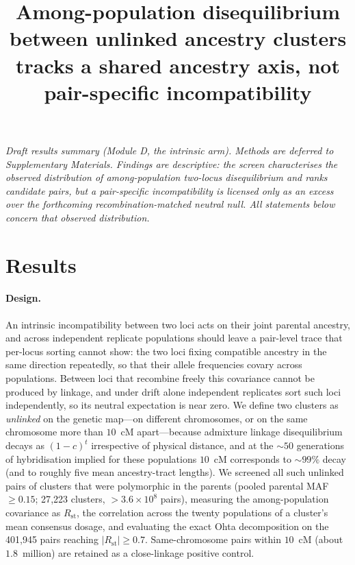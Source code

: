 \documentclass[11pt]{article}
\title{\vspace{-3em}Among-population disequilibrium between unlinked ancestry
clusters tracks a shared ancestry axis, not pair-specific incompatibility}
\author{}
\date{}
\newcommand{\Rst}{\ensuremath{R_{\mathrm{st}}}}
\begin{document}
\maketitle
\vspace{-4em}

\noindent\textit{Draft results summary (Module D, the intrinsic arm). Methods are
deferred to Supplementary Materials. Findings are descriptive: the screen
characterises the observed distribution of among-population two-locus
disequilibrium and ranks candidate pairs, but a pair-specific incompatibility is
licensed only as an excess over the forthcoming recombination-matched neutral
null. All statements below concern that observed distribution.}

\section*{Results}

\paragraph{Design.}
An intrinsic incompatibility between two loci acts on their joint parental
ancestry, and across independent replicate populations should leave a pair-level
trace that per-locus sorting cannot show: the two loci fixing compatible ancestry
in the same direction repeatedly, so that their allele frequencies covary across
populations. Between loci that recombine freely this covariance cannot be produced
by linkage, and under drift alone independent replicates sort such loci
independently, so its neutral expectation is near zero. We define two clusters as
\emph{unlinked} on the genetic map---on different chromosomes, or on the same
chromosome more than $10$~cM apart---because admixture linkage disequilibrium
decays as $(1-c)^t$ irrespective of physical distance, and at the $\sim\!50$
generations of hybridisation implied for these populations $10$~cM corresponds to
$\sim\!99\%$ decay (and to roughly five mean ancestry-tract lengths). We screened
all such unlinked pairs of clusters that were polymorphic in the parents (pooled
parental MAF $\ge 0.15$; 27{,}223 clusters, $>\!3.6\times10^{8}$ pairs), measuring
the among-population covariance as \Rst{}, the correlation across the twenty
populations of a cluster's mean consensus dosage, and evaluating the exact Ohta
decomposition on the 401{,}945 pairs reaching $|\Rst| \ge 0.7$. Same-chromosome
pairs within $10$~cM (about $1.8$~million) are retained as a close-linkage
positive control.
\end{document}
